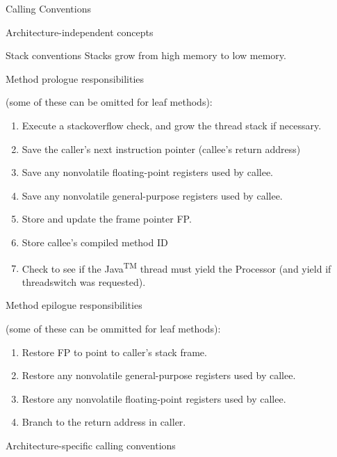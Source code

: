 \begin{section}{Calling Conventions}
\begin{subsection}{Architecture-independent concepts}
\begin{subsubsection}{Stack conventions}
Stacks grow from high memory to low memory.

\end{subsubsection}

\begin{subsubsection}{Method prologue responsibilities}

(some of these can be omitted for leaf methods):
\begin{enumerate}
  \item Execute a stackoverflow check, and grow the thread stack if necessary.
  \item Save the caller's next instruction pointer (callee's return address)
  \item Save any nonvolatile floating-point registers used by callee.
  \item Save any nonvolatile general-purpose registers used by callee.
  \item Store and update the frame pointer FP.
  \item Store callee's compiled method ID
  \item Check to see if the Java\textsuperscript{TM} thread must yield the Processor (and yield if threadswitch was requested).
\end{enumerate}

\end{subsubsection}

\begin{subsubsection}{Method epilogue responsibilities}

(some of these can be ommitted for leaf methods):
\begin{enumerate}
  \item Restore FP to point to caller's stack frame.
  \item Restore any nonvolatile general-purpose registers used by callee.
  \item Restore any nonvolatile floating-point registers used by callee.
  \item Branch to the return address in caller.
\end{enumerate}

\end{subsubsection}

\end{subsection}

\begin{subsection}{Architecture-specific calling conventions}


\end{subsection}
\end{section}
